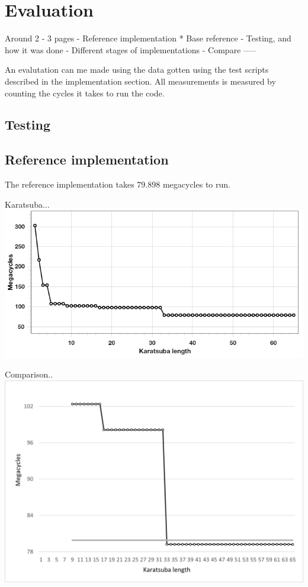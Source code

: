 \section{Evaluation}
	Around 2 - 3 pages
    - Reference implementation
     * Base reference
    - Testing, and how it was done
    - Different stages of implementations
    - Compare
-----


An evalutation can me made using the data gotten using the test scripts described in the implementation section. All measurements is measured by counting the cycles it takes to run the code.

\subsection{Testing}



\subsection{Reference implementation}
The reference implementation takes $79.898$ megacycles to run.


Karatsuba...
\includegraphics{images/karatsuba.png}



Comparison..
\includegraphics{images/karatsuba-compared.png}
    